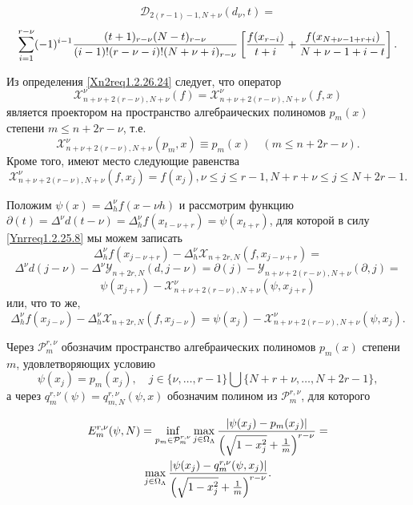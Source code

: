 $$
\mathcal{D}_{2(r-1)-1,N+\nu}(d_\nu,t)=
$$
\begin{equation}\label{Xn2req1.2.26.26}
\sum_{i=1}^{r-\nu}(-1)^{i-1}{(t+1)_{r-\nu}(N-t)_{r-\nu}\over
(i-1)!(r-\nu-i)!(N+\nu+i)_{r-\nu}}\left[{f(x_{r-i})\over t+i}+{f(x_{N+\nu-1+r+i})\over
N+\nu-1+i-t}\right].
\end{equation}



Из определения \eqref{Xn2req1.2.26.24} следует, что оператор
$$
\mathcal{X}^\nu_{n+\nu+2(r-\nu),N+\nu}(f)=\mathcal{X}^\nu_{n+\nu+2(r-\nu),N+\nu}(f,x)
$$
является проектором на пространство алгебраических полиномов $p_m(x)$ степени $m\le n+2r-\nu$, т.е.
\begin{equation}\label{Xn2req1.2.26.27}
\mathcal{X}^\nu_{n+\nu+2(r-\nu),N+\nu}(p_m,x)\equiv p_m(x)\quad ( m\le n+2r-\nu).
\end{equation}
Кроме того, имеют место следующие равенства
\begin{equation}\label{Xn2req1.2.26.27}
\mathcal{X}^\nu_{n+\nu+2(r-\nu),N+\nu}(f,x_j)=f(x_j), \nu\le j\le r-1, N+r+\nu\le j\le N+2r-1.
\end{equation}



Положим $\psi(x)=\Delta^\nu_hf(x-\nu h)$ и рассмотрим функцию  $\partial(t)=\Delta^\nu d(t-\nu)=\Delta^\nu_hf(x_{t-\nu+r})=\psi(x_{t+r})$, для которой  в силу \eqref{Ynrreq1.2.25.8} мы можем записать
$$
\Delta_h^\nu f(x_{j-\nu+r})-\Delta_h^\nu\mathcal{X}_{n+2r,N}(f,x_{j-\nu+r})=
$$
$$
\Delta^\nu d(j-\nu)-\Delta^\nu\mathcal{Y}_{n+2r,N}(d,j-\nu)=\partial(j)-\mathcal{Y}_{n+\nu+2(r-\nu),N+\nu}(\partial,j)=
$$
$$
\psi(x_{j+r})-\mathcal{X}^\nu_{n+\nu+2(r-\nu),N+\nu}(\psi,x_{j+r})
$$
или, что то же,
\begin{equation}\label{Xn2req1.2.26.28}
\Delta_h^\nu f(x_{j-\nu})-\Delta_h^\nu\mathcal{X}_{n+2r,N}(f,x_{j-\nu})=
\psi(x_{j})-\mathcal{X}^\nu_{n+\nu+2(r-\nu),N+\nu}(\psi,x_{j}).
\end{equation}


Через $\mathcal{P}_m^{r,\nu}$ обозначим пространство алгебраических полиномов  $p_m(x)$ степени $m$, удовлетворяющих условию
\begin{equation}\label{Xn2req1.2.26.29}
\psi(x_j)=p_m(x_j),\quad j\in
\{\nu,\ldots,r-1\}\bigcup\{N+r+\nu,\ldots,N+2r-1\},
\end{equation}
а через  $q_m^{r,\nu}(\psi)=q_{m,N}^{r,\nu}(\psi,x)$ обозначим полином из $\mathcal{P}_m^{r,\nu}$,
 для которого

\begin{multline}\label{Xn2req1.2.26.30}
 E_m^{r,\nu}(\psi,N)=\inf_{p_m\in\mathcal{P}_m^{r,\nu}}\max_{j\in \Omega_\Lambda}{|\psi(x_j)-p_m(x_j)|\over\left(\sqrt{1-x_j^2}+\frac1m\right)^{r-\nu}}=\\
 \max_{j\in \Omega_\Lambda}{|\psi(x_j)-q_m^{r,\nu}(\psi,x_j)|\over\left(\sqrt{1-x_j^2}+\frac1m\right)^{r-\nu}}.
\end{multline}

